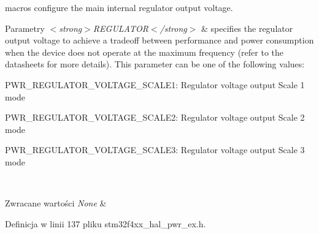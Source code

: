 macros configure the main internal regulator output voltage. 


\begin{DoxyParams}{Parametry}
{\em $<$strong$>$\+R\+E\+G\+U\+L\+A\+T\+O\+R$<$/strong$>$} & specifies the regulator output voltage to achieve a tradeoff between performance and power consumption when the device does not operate at the maximum frequency (refer to the datasheets for more details). This parameter can be one of the following values\+: \begin{DoxyItemize}
\item P\+W\+R\+\_\+\+R\+E\+G\+U\+L\+A\+T\+O\+R\+\_\+\+V\+O\+L\+T\+A\+G\+E\+\_\+\+S\+C\+A\+L\+E1\+: Regulator voltage output Scale 1 mode \item P\+W\+R\+\_\+\+R\+E\+G\+U\+L\+A\+T\+O\+R\+\_\+\+V\+O\+L\+T\+A\+G\+E\+\_\+\+S\+C\+A\+L\+E2\+: Regulator voltage output Scale 2 mode \item P\+W\+R\+\_\+\+R\+E\+G\+U\+L\+A\+T\+O\+R\+\_\+\+V\+O\+L\+T\+A\+G\+E\+\_\+\+S\+C\+A\+L\+E3\+: Regulator voltage output Scale 3 mode \end{DoxyItemize}
\\
\hline
\end{DoxyParams}

\begin{DoxyRetVals}{Zwracane wartości}
{\em None} & \\
\hline
\end{DoxyRetVals}


Definicja w linii 137 pliku stm32f4xx\+\_\+hal\+\_\+pwr\+\_\+ex.\+h.

